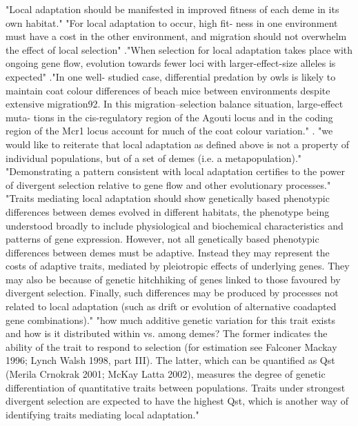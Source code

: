 \documentclass[10pt,letterpaper]{article}
\begin{document}
"Local adaptation should be manifested in improved fitness of each deme in its own habitat." \cite{Kawecki:2004hx}  "For local adaptation to occur, high fit- ness in one environment must have a cost in the other environment, and migration should not overwhelm the effect of local selection" \cite{Savolainen:2013df}."When selection for local adaptation takes place with ongoing gene flow, evolution towards fewer loci with larger-effect-size alleles is expected" \cite{Savolainen:2013df}."In one well- studied case, differential predation by owls is likely to maintain coat colour differences of beach mice between environments despite extensive migration92. In this migration–selection balance situation, large-effect muta- tions in the cis-regulatory region of the Agouti locus and in the coding region of the Mcr1 locus account for much of the coat colour variation." \cite{Savolainen:2013df}. "we would like to reiterate that local adaptation as defined above is not a property of individual populations, but of a set of demes (i.e. a metapopulation)." \cite{Kawecki:2004hx} "Demonstrating a pattern consistent with local adaptation certifies to the power of divergent selection relative to gene flow and other evolutionary processes." \cite{Kawecki:2004hx} "Traits mediating local adaptation should show genetically based phenotypic differences between demes evolved in different habitats, the phenotype being understood broadly to include physiological and biochemical characteristics and patterns of gene expression. However, not all genetically based phenotypic differences between demes must be adaptive. Instead they may represent the costs of adaptive traits, mediated by pleiotropic effects of underlying genes. They may also be because of genetic hitchhiking of genes linked to those favoured by divergent selection. Finally, such differences may be produced by processes not related to local adaptation (such as drift or evolution of alternative coadapted gene combinations)." \cite{Kawecki:2004hx} "how much additive genetic variation for this trait exists and how is it distributed within vs. among demes? The former indicates the ability of the trait to respond to selection (for estimation see Falconer  Mackay 1996; Lynch Walsh 1998, part III). The latter, which can be quantified as Qst (Merila  Crnokrak 2001; McKay Latta 2002), measures the degree of genetic differentiation of quantitative traits between populations. Traits under strongest divergent selection are expected to have the highest Qst, which is another way of identifying traits mediating local adaptation." \cite{Kawecki:2004hx} 
\end{document}
